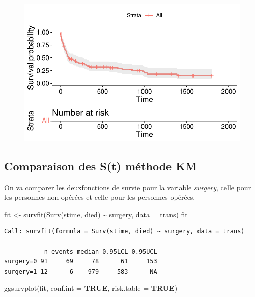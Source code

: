 \documentclass[
  12pt,
  letterpaper,
  DIV=11,
  numbers=noendperiod,
  onepage,
  openany]{scrreprt}
\newenvironment{Shaded}{\begin{snugshade}}{\end{snugshade}}
\newcommand{\AttributeTok}[1]{\textcolor[rgb]{0.80,0.80,0.80}{#1}}
\newcommand{\ConstantTok}[1]{\textcolor[rgb]{0.86,0.64,0.64}{\textbf{#1}}}
\newcommand{\FunctionTok}[1]{\textcolor[rgb]{0.94,0.94,0.56}{#1}}
\newcommand{\NormalTok}[1]{\textcolor[rgb]{0.80,0.80,0.80}{#1}}
\newcommand{\OtherTok}[1]{\textcolor[rgb]{0.94,0.94,0.56}{#1}}
\newcommand{\SpecialCharTok}[1]{\textcolor[rgb]{0.86,0.64,0.64}{#1}}
\begin{document}
\begin{figure}[H]

{\centering \includegraphics{14-R_files/figure-pdf/unnamed-chunk-10-1.pdf}

}

\end{figure}

\hypertarget{comparaison-des-st-muxe9thode-km}{%
\subsection{Comparaison des S(t) méthode
KM}\label{comparaison-des-st-muxe9thode-km}}

On va comparer les deuxfonctions de survie pour la variable
\emph{surgery}, celle pour les personnes non opérées et celle pour les
personnes opérées.

\begin{Shaded}
\begin{Highlighting}[]
\NormalTok{fit }\OtherTok{\textless{}{-}} \FunctionTok{survfit}\NormalTok{(}\FunctionTok{Surv}\NormalTok{(stime, died) }\SpecialCharTok{\textasciitilde{}}\NormalTok{ surgery, }\AttributeTok{data =}\NormalTok{ trans)}
\NormalTok{fit}
\end{Highlighting}
\end{Shaded}

\begin{verbatim}
Call: survfit(formula = Surv(stime, died) ~ surgery, data = trans)

           n events median 0.95LCL 0.95UCL
surgery=0 91     69     78      61     153
surgery=1 12      6    979     583      NA
\end{verbatim}

\begin{Shaded}
\begin{Highlighting}[]
\FunctionTok{ggsurvplot}\NormalTok{(fit, }\AttributeTok{conf.int =} \ConstantTok{TRUE}\NormalTok{, }\AttributeTok{risk.table =} \ConstantTok{TRUE}\NormalTok{)}
\end{Highlighting}
\end{Shaded}
\end{document}
